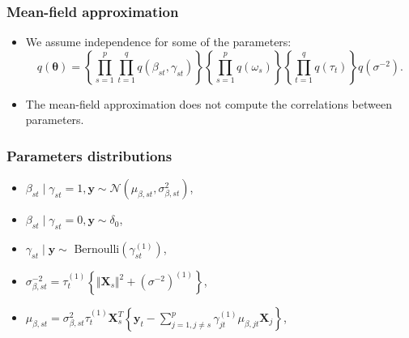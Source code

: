 \documentclass{beamer}
\begin{document}
\begin{frame}
\frametitle{Mean-field approximation}
\begin{itemize}
\item We assume independence for some of the parameters:
$$
q(\boldsymbol{\theta}) = \left\lbrace\prod_{s=1}^p\prod_{t=1}^qq(\beta_{st},\gamma_{st})\right\rbrace\left\lbrace\prod_{s=1}^pq(\omega_s)\right\rbrace\left\lbrace\prod_{t=1}^qq(\tau_t)\right\rbrace q(\sigma^{-2}).
$$
\item The mean-field approximation does not compute the correlations between parameters.
\end{itemize}
\begin{figure}
\centering
{}\end{figure}
\end{frame}

\begin{frame}
\frametitle{Parameters distributions}
\begin{itemize}
\item $\beta_{st} \mid \gamma_{st} = 1, \boldsymbol{y} \sim \mathcal{N}\left(\mu_{\beta,st},\sigma_{\beta,st}^2\right)$,
\item $\beta_{st} \mid \gamma_{st} = 0, \boldsymbol{y} \sim \delta_0$,
\item $\gamma_{st} \mid \boldsymbol{y} \sim $ Bernoulli$(\gamma_{st}^{(1)})$,
\vspace{2em}
\item $\sigma^{-2}_{\beta,st} = \tau_t^{(1)}\left\lbrace \Vert \boldsymbol{X}_s \Vert^2 + (\sigma^{-2})^{(1)}\right\rbrace $,
\item $\mu_{\beta,st}=\sigma^2_{\beta,st}\tau^{(1)}_t\boldsymbol{X}_s^T\left\lbrace\boldsymbol{y}_t - \sum_{j=1, j \neq s}^p \gamma_{jt}^{(1)}\mu_{\beta,jt}\boldsymbol{X}_j\right\rbrace $,
\end{itemize}
\end{frame}
\end{document}
